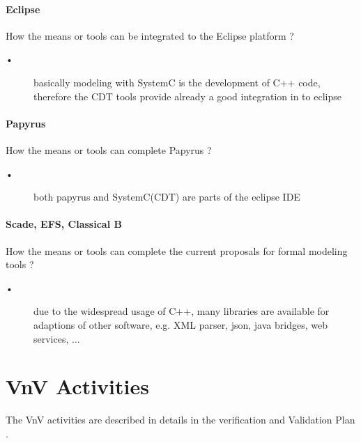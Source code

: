 \paragraph{Eclipse}
How the means or tools can be integrated to the Eclipse platform ?

\begin{author_comment}
\begin{description}
\item [•] basically modeling with SystemC is the development of C++ code, therefore the CDT tools provide already a good integration in to eclipse
\end{description}
\end{author_comment}

\paragraph{Papyrus}
How the means or tools can complete  Papyrus ?

\begin{author_comment}
\begin{description}
\item [•] both papyrus and SystemC(CDT) are parts of the eclipse IDE
\end{description}
\end{author_comment}


\paragraph{Scade, EFS, Classical B}
How the means or tools can complete the current proposals for formal modeling tools ?

\begin{author_comment}
\begin{description}
\item [•] due to the widespread usage of C++, many libraries are available for adaptions of other software, e.g. XML parser, json, java bridges, web services, ...
\end{description}
\end{author_comment}

\section{VnV Activities}

The VnV activities are described in details in the verification and Validation Plan  \citep{D4.1}.

